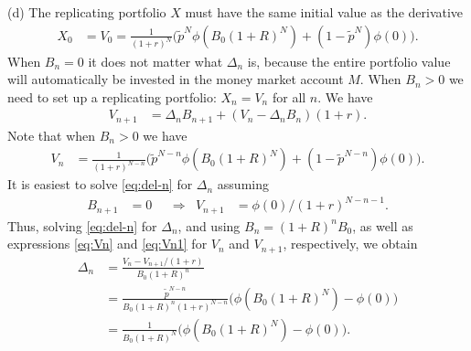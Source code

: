 \documentclass[12pt]{book}
\let\varphi\phi
\numberwithin{equation}{chapter}
\theoremstyle{plain}
\numberwithin{theorem}{section}
\theoremstyle{definition}
\numberwithin{exercise}{chapter}
\newcommand{\<}{\langle}
\renewcommand{\>}{\rangle}
\renewcommand{\(}{\left(}
\renewcommand{\)}{\right)}
\renewcommand{\[}{\left[}
\renewcommand{\]}{\right]}
\newcommand\Del{\Delta}
\theoremstyle{definition}
\numberwithin{question}{section}
\newcommand\pt{\widetilde{p}}
\begin{document}
(d) The replicating portfolio $X$ must have the same initial value as the derivative
\begin{align}
X_0
	&=	V_0
	=		\frac{1}{(1+r)^{N}} \Big( \pt^{N} \varphi(B_0(1+R)^{N}) + (1 - \pt^{N} ) \varphi(0) \Big).
\end{align}
When $B_n = 0$ it does not matter what $\Del_n$ is, because the entire portfolio value will automatically be invested in the money market account $M$.
When $B_n > 0$ we need to set up a replicating portfolio: $X_n = V_n$ for all $n$.  We have
\begin{align}
V_{n+1}
	&=	\Del_n B_{n+1} + ( V_n - \Del_n B_n ) (1 + r) . \label{eq:del-n}
\end{align}
Note that when $B_n > 0$ we have
\begin{align}
V_n
	&=	\frac{1}{(1+r)^{N-n}} \Big( \pt^{N-n} \varphi(B_0(1+R)^{N}) + (1 - \pt^{N-n} ) \varphi(0) \Big) . \label{eq:Vn}
\end{align}
It is easiest to solve \eqref{eq:del-n} for $\Del_n$ assuming 
\begin{align}
B_{n+1} 
	&= 0  &
	&\Rightarrow& 
V_{n+1} 
	&= \varphi(0) / (1+r)^{N-n-1} .  \label{eq:Vn1}
\end{align}
Thus, solving \eqref{eq:del-n} for $\Del_n$, and using $B_n = (1+R)^n B_0$, as well as expressions \eqref{eq:Vn} and \eqref{eq:Vn1} for $V_n$ and $V_{n+1}$, respectively, we obtain 
\begin{align}
\Del_n
	&=	\frac{V_n - V_{n+1}/(1+r)}{B_0(1+R)^n} \\
	&=	\frac{\pt^{N-n}}{B_0(1+R)^n (1+r)^{N-n}} \Big(  \varphi(B_0(1+R)^{N})  - \varphi(0) \Big) \\
	&=	\frac{1}{B_0(1+R)^N} \Big(  \varphi(B_0(1+R)^{N})  - \varphi(0) \Big) .
\end{align}

\end{document}
